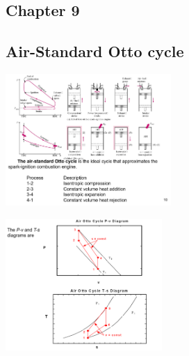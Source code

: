 \documentclass[10pt,landscape]{article}
\newenvironment{Figure}
     {\par\medskip\noindent\minipage{\linewidth}}
     {\endminipage\par\medskip}
\begin{document}
\begin{multicols}{3}

\section{Chapter 9}
\subsection{Air-Standard Otto cycle}
\begin{Figure}
    \centering
    \includegraphics[width=\linewidth, height=5cm]{Air-Standard_OttoCycle.png}
\end{Figure}
\begin{Figure}
    \centering
    \includegraphics[width=\linewidth, height=5cm]{Air-Standard_OttoCycle_PVTS.png}
\end{Figure}

\end{multicols}
\end{document}
